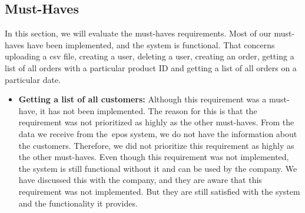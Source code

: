 \subsection{Must-Haves}\label{subsec:must-haves}

In this section, we will evaluate the must-haves requirements.
Most of our must-haves have been implemented, and the system is functional.
That concerns uploading a csv file, creating a user, deleting a user, creating an order, getting a list of all orders
with a particular product ID and getting a list of all orders on a particular date.

\begin{itemize}
    \item \textbf{Getting a list of all customers:}
    Although this requirement was a must-have, it has not been implemented.
    The reason for this is that the requirement was not prioritized as highly as the other must-haves.
    From the data we receive from the~\acrshort{epos} system, we do not have the information about the customers.
    Therefore, we did not prioritize this requirement as highly as the other must-haves.
    Even though this requirement was not implemented, the system is still functional without it and can be used by the
    company. %
    We have discussed this with the company, and they are aware that this requirement was not implemented.
    But they are still satisfied with the system and the functionality it provides.
\end{itemize}
